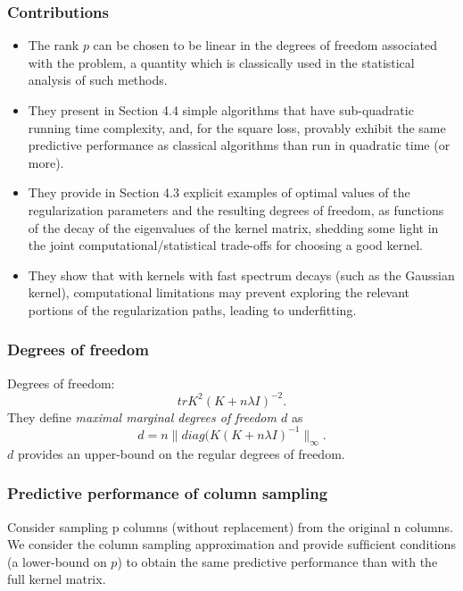 \begin{frame}
    \frametitle{Contributions}

    \begin{itemize}
        \item The rank $p$ can be chosen to be linear in the degrees of freedom associated with the problem, a quantity which
        is classically used in the statistical analysis of such methods. 
        \item They present in Section 4.4 simple algorithms that have sub-quadratic running time complexity,
        and, for the square loss, provably exhibit the same predictive performance as classical algorithms than run in quadratic time (or more).
        
    \item They provide in Section 4.3 explicit examples of optimal values of the regularization parameters
and the resulting degrees of freedom, as functions of the decay of the eigenvalues of the kernel matrix, shedding some light in the joint computational/statistical trade-offs for choosing a
good kernel.
\item  They show that with kernels with fast spectrum decays (such as the
Gaussian kernel), computational limitations may prevent exploring the relevant portions of the
regularization paths, leading to underﬁtting.
    \end{itemize}
\end{frame}

\begin{frame}
    \frametitle{Degrees of freedom}

    Degrees of freedom: 
    \begin{equation}
        tr K^2(K + n \lambda I)^{-2}.
    \end{equation}
    They  define \textit{maximal marginal degrees of freedom $d$}
    as 
    \begin{equation}
        d 
        = 
        n \|
        diag( K(K + n \lambda I)^{-1}
        \|_\infty. 
    \end{equation}
    $d$ provides an upper-bound on the regular degrees of freedom.
\end{frame}


\begin{frame}
    \frametitle{Predictive performance of column sampling}

    Consider sampling p columns (without replacement) from the original n columns. We consider
the column sampling approximation and provide sufﬁcient conditions (a lower-bound on $p$) to obtain the same predictive performance than with the full kernel matrix.

\end{frame}

